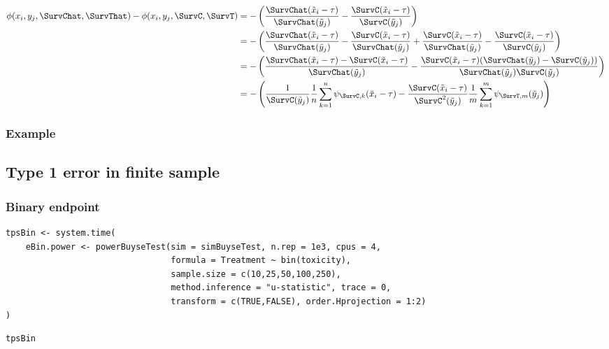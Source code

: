 \documentclass[12pt]{article}
\newcommand\xobs{\tilde{x}}
\newcommand\yobs{\tilde{y}}
\begin{document}
\begin{align*}
\phi(x_i,y_j,\SurvChat,\SurvThat) - \phi(x_i,y_j,\SurvC,\SurvT) &= -\left( \frac{\SurvChat(\xobs_i-\tau)}{\SurvChat(\yobs_j)} - \frac{\SurvC(\xobs_i-\tau)}{\SurvC(\yobs_j)} \right) \\
&= -\left( \frac{\SurvChat(\xobs_i-\tau)}{\SurvChat(\yobs_j)} - \frac{\SurvC(\xobs_i-\tau)}{\SurvChat(\yobs_j)} + \frac{\SurvC(\xobs_i-\tau)}{\SurvChat(\yobs_j)} - \frac{\SurvC(\xobs_i-\tau)}{\SurvC(\yobs_j)} \right)  \\
&= -\left( \frac{\SurvChat(\xobs_i-\tau)-\SurvC(\xobs_i-\tau)}{\SurvChat(\yobs_j)} - \frac{\SurvC(\xobs_i-\tau)(\SurvChat(\yobs_j)-\SurvC(\yobs_j))}{\SurvChat(\yobs_j)\SurvC(\yobs_j)} \right)  \\
&= -\left( \frac{1}{\SurvC(\yobs_j)} \frac{1}{n} \sum_{k=1}^n \psi_{\SurvC,k}(\xobs_i-\tau) - \frac{\SurvC(\xobs_i-\tau)}{\SurvC^2(\yobs_j)} \frac{1}{m} \sum_{k=1}^m \psi_{\SurvT,m}(\yobs_j)\right)  \\
\end{align*}




\subsubsection{Example}
\label{sec:org715b87d}

\subsection{Type 1 error in finite sample}
\label{sec:orga01dbf4}

\subsubsection{Binary endpoint}
\label{sec:org3230a9f}
\lstset{language=r,label= ,caption= ,captionpos=b,numbers=none}
\begin{lstlisting}
tpsBin <- system.time(
	eBin.power <- powerBuyseTest(sim = simBuyseTest, n.rep = 1e3, cpus = 4,
								 formula = Treatment ~ bin(toxicity),
								 sample.size = c(10,25,50,100,250),                                   
								 method.inference = "u-statistic", trace = 0,
								 transform = c(TRUE,FALSE), order.Hprojection = 1:2)
)
\end{lstlisting}

\lstset{language=r,label= ,caption= ,captionpos=b,numbers=none}
\begin{lstlisting}
tpsBin
\end{lstlisting}
\end{document}
